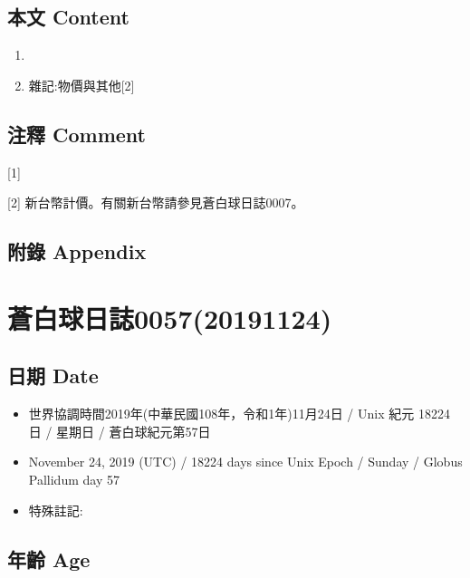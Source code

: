 \documentclass[a5paper, 12pt
]{book}
\providecommand{\tightlist}{%
  \setlength{\itemsep}{0pt}\setlength{\parskip}{0pt}}
\begin{document}
\hypertarget{ux672cux6587-content-55}{%
\subsection{本文 Content}\label{ux672cux6587-content-55}}

\begin{enumerate}
\def\labelenumi{\arabic{enumi}.}
\item
\item
  雜記:物價與其他{[}2{]}
\end{enumerate}

\hypertarget{ux6ce8ux91cb-comment-49}{%
\subsection{注釋 Comment}\label{ux6ce8ux91cb-comment-49}}

{[}1{]}

{[}2{]} 新台幣計價。有關新台幣請參見蒼白球日誌0007。

\hypertarget{ux9644ux9304-appendix-48}{%
\subsection{附錄 Appendix}\label{ux9644ux9304-appendix-48}}

\hypertarget{ux84bcux767dux7403ux65e5ux8a8c005720191124}{%
\section{蒼白球日誌0057(20191124)}\label{ux84bcux767dux7403ux65e5ux8a8c005720191124}}

\hypertarget{ux65e5ux671f-date-56}{%
\subsection{日期 Date}\label{ux65e5ux671f-date-56}}

\begin{itemize}
\tightlist
\item
  世界協調時間2019年(中華民國108年，令和1年)11月24日 / Unix 紀元 18224
  日 / 星期日 / 蒼白球紀元第57日
\item
  November 24, 2019 (UTC) / 18224 days since Unix Epoch / Sunday /
  Globus Pallidum day 57
\item
  特殊註記:
\end{itemize}

\hypertarget{ux5e74ux9f61-age-56}{%
\subsection{年齡 Age}\label{ux5e74ux9f61-age-56}}
\end{document}
